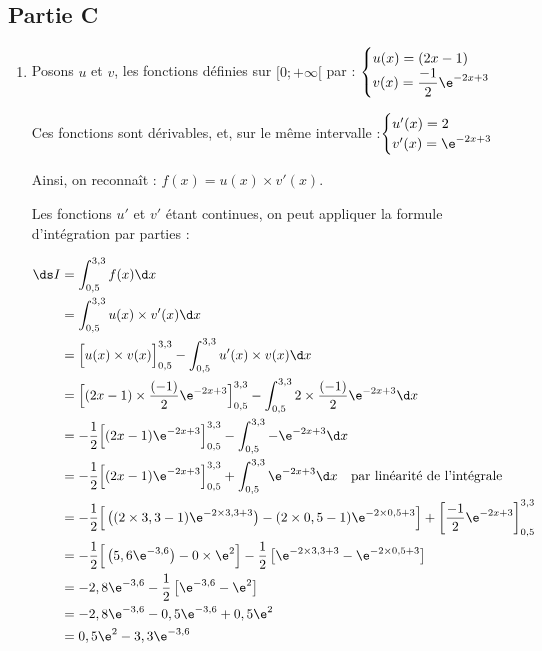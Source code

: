 \subsection*{Partie C}
	\begin{enumerate}
		\item Posons $u$ et $v$, les fonctions définies sur $[0 ; + \infty[$ par : \quad $\begin{cases}
			u(x) = (2x - 1)\\
			v(x) = \dfrac{-1}{2}\e^{-2x+3}
		\end{cases}$

		Ces fonctions sont dérivables, et, sur le même intervalle :\quad $\begin{cases}
			u'(x) = 2\\
			v'(x) = \e^{-2x+3}
			\end{cases}$

		Ainsi, on reconnaît : \quad $f(x) = u(x)\times v'(x)$.

		Les fonctions $u'$ et $v'$ étant continues, on peut appliquer la formule d'intégration par parties :

		$\begin{aligned} \ds
			I &= \int_{0,5}^{3,3} f(x) \d x\\
				&= \int_{0,5}^{3,3} u(x)\times v'(x) \d x\\
				&= \Big[u(x) \times v(x)\Big]_{0,5}^{3,3} - \int_{0,5}^{3,3} u'(x)\times v(x) \d x\\
				&= \Big[(2x-1) \times \dfrac{(-1)}{2}\e^{-2x+3}\Big]_{0,5}^{3,3} - \int_{0,5}^{3,3} 2\times \dfrac{(-1)}{2}\e^{-2x+3} \d x\\
				&= -\dfrac{1}{2} \Big[(2x-1)\e^{-2x+3}\Big]_{0,5}^{3,3} - \int_{0,5}^{3,3} -\e^{-2x+3} \d x\\
				&= -\dfrac{1}{2} \Big[(2x-1)\e^{-2x+3}\Big]_{0,5}^{3,3} + \int_{0,5}^{3,3} \e^{-2x+3} \d x\quad \text{par linéarité de l'intégrale}\\
				&= -\dfrac{1}{2} \Big[\left( (2\times 3,3-1)\e^{-2\times 3,3+3}\right) - (2\times 0,5 - 1)\e^{-2\times 0,5 + 3}\Big] + \left[\dfrac{-1}{2}  \e^{-2x+3}\right]_{0,5}^{3,3}\\
				&= -\dfrac{1}{2} \Big[\left( 5,6\e^{-3,6}\right) - 0\times \e^{2}\Big] -\dfrac{1}{2} \left[\e^{-2\times 3,3+3} - \e^{-2\times 0,5 + 3}\right]\\
				&= -2,8\e^{-3,6} -\dfrac{1}{2} \left[\e^{-3,6} - \e^{2}\right]\\
				&= -2,8\e^{-3,6} - 0,5\e^{-3,6} +0,5 \e^{2}\\
				&= 0,5\e^{2} - 3,3\e^{-3,6}
		\end{aligned}$


\end{enumerate}
